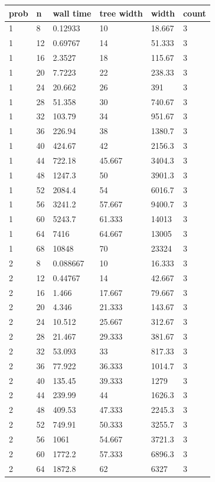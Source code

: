\begin{tabular}{|p{0.6cm}|p{0.5cm}|p{1.15cm}|p{1cm}|p{1cm}|p{0.7cm}|}
\toprule
prob & n & wall time & tree width & width & count \\
\midrule
1 & 8 & 0.12933 & 10 & 18.667 & 3 \\
1 & 12 & 0.69767 & 14 & 51.333 & 3 \\
1 & 16 & 2.3527 & 18 & 115.67 & 3 \\
1 & 20 & 7.7223 & 22 & 238.33 & 3 \\
1 & 24 & 20.662 & 26 & 391 & 3 \\
1 & 28 & 51.358 & 30 & 740.67 & 3 \\
1 & 32 & 103.79 & 34 & 951.67 & 3 \\
1 & 36 & 226.94 & 38 & 1380.7 & 3 \\
1 & 40 & 424.67 & 42 & 2156.3 & 3 \\
1 & 44 & 722.18 & 45.667 & 3404.3 & 3 \\
1 & 48 & 1247.3 & 50 & 3901.3 & 3 \\
1 & 52 & 2084.4 & 54 & 6016.7 & 3 \\
1 & 56 & 3241.2 & 57.667 & 9400.7 & 3 \\
1 & 60 & 5243.7 & 61.333 & 14013 & 3 \\
1 & 64 & 7416 & 64.667 & 13005 & 3 \\
1 & 68 & 10848 & 70 & 23324 & 3 \\
2 & 8 & 0.088667 & 10 & 16.333 & 3 \\
2 & 12 & 0.44767 & 14 & 42.667 & 3 \\
2 & 16 & 1.466 & 17.667 & 79.667 & 3 \\
2 & 20 & 4.346 & 21.333 & 143.67 & 3 \\
2 & 24 & 10.512 & 25.667 & 312.67 & 3 \\
2 & 28 & 21.467 & 29.333 & 381.67 & 3 \\
2 & 32 & 53.093 & 33 & 817.33 & 3 \\
2 & 36 & 77.922 & 36.333 & 1014.7 & 3 \\
2 & 40 & 135.45 & 39.333 & 1279 & 3 \\
2 & 44 & 239.99 & 44 & 1626.3 & 3 \\
2 & 48 & 409.53 & 47.333 & 2245.3 & 3 \\
2 & 52 & 749.91 & 50.333 & 3255.7 & 3 \\
2 & 56 & 1061 & 54.667 & 3721.3 & 3 \\
2 & 60 & 1772.2 & 57.333 & 6896.3 & 3 \\
2 & 64 & 1872.8 & 62 & 6327 & 3 \\

\end{tabular}
